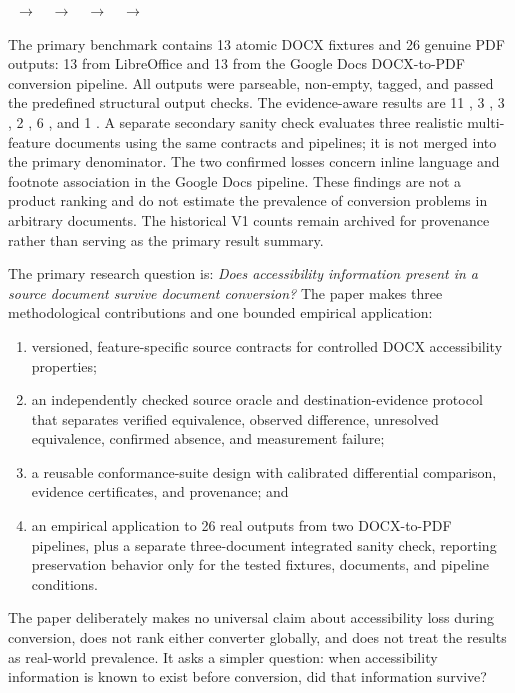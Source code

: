 \begin{center}
\ $\rightarrow$\ 
\ $\rightarrow$\ 
\ $\rightarrow$\ 
\ $\rightarrow$\ 
\end{center}

The primary benchmark contains 13 atomic DOCX fixtures and 26 genuine PDF outputs: 13 from LibreOffice and 13 from the Google Docs DOCX-to-PDF conversion pipeline. All outputs were parseable, non-empty, tagged, and passed the predefined structural output checks. The evidence-aware results are 11 \verifiedpreserved{}, 3 \observedpartial{}, 3 \altered{}, 2 \confirmedlost{}, 6 \unresolved{}, and 1 \measured{}. A separate secondary sanity check evaluates three realistic multi-feature documents using the same contracts and pipelines; it is not merged into the primary denominator. The two confirmed losses concern inline language and footnote association in the Google Docs pipeline. These findings are not a product ranking and do not estimate the prevalence of conversion problems in arbitrary documents. The historical V1 counts remain archived for provenance rather than serving as the primary result summary.

The primary research question is: \emph{Does accessibility information present in a source document survive document conversion?} The paper makes three methodological contributions and one bounded empirical application:

\begin{enumerate}
\item versioned, feature-specific source contracts for controlled DOCX accessibility properties;
\item an independently checked source oracle and destination-evidence protocol that separates verified equivalence, observed difference, unresolved equivalence, confirmed absence, and measurement failure;
\item a reusable conformance-suite design with calibrated differential comparison, evidence certificates, and provenance; and
\item an empirical application to 26 real outputs from two DOCX-to-PDF pipelines, plus a separate three-document integrated sanity check, reporting preservation behavior only for the tested fixtures, documents, and pipeline conditions.
\end{enumerate}

The paper deliberately makes no universal claim about accessibility loss during conversion, does not rank either converter globally, and does not treat the results as real-world prevalence. It asks a simpler question: when accessibility information is known to exist before conversion, did that information survive?


